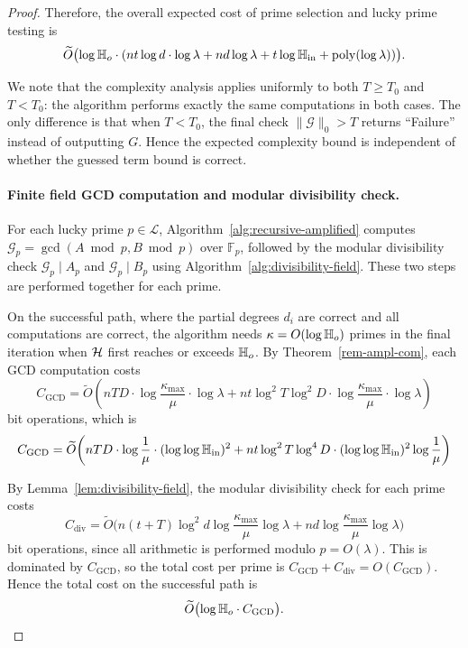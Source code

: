\documentclass{article}
\numberwithin{equation}{section}
\begin{document}
\begin{proof}
Therefore, the overall expected cost of prime selection and lucky prime testing is
\[
\widetilde{O}\bigl( \log \mathbb{H}_{o} \cdot (n t \log d \cdot \log \lambda + n d \log \lambda + t\log\mathbb{H}_{\rm in}+\operatorname{poly}(\log \lambda)) \bigr).
\]

We note that the complexity analysis applies uniformly to both $T \ge T_0$ and $T < T_0$: the algorithm performs exactly the same computations in both cases. The only difference is that when $T < T_0$, the final check $\|\mathcal{G}\|_0 > T$ returns ``Failure'' instead of outputting $G$. Hence the expected complexity bound is independent of whether the guessed term bound is correct.


\paragraph{Finite field GCD computation and modular divisibility check.}
For each lucky prime $p \in \mathcal{L}$, Algorithm~\ref{alg:recursive-amplified} computes $\mathcal{G}_p = \gcd(A \bmod p, B \bmod p)$ over $\mathbb{F}_p$, followed by the modular divisibility check $\mathcal{G}_p \mid A_p$ and $\mathcal{G}_p \mid B_p$ using Algorithm~\ref{alg:divisibility-field}. These two steps are performed together for each prime.

On the successful path, where the partial degrees $d_i$ are correct and all computations are correct, the algorithm needs $\kappa = O(\log \mathbb{H}_{o})$ primes in the final iteration when ${\mathcal{H}}$ first reaches or exceeds $\mathbb{H}_{o}$. By Theorem~\ref{rem-ampl-com}, each GCD computation costs
\[
C_{\text{GCD}} = \widetilde{O}\!\left( n T D \cdot \log \frac{\kappa_{\max}}{\mu}\cdot\log\lambda + n t \log^2 T \log^2 D \cdot \log \frac{\kappa_{\max}}{\mu}\cdot\log\lambda \right)
\]
bit operations, which is \[
C_{\text{GCD}} = \widetilde{O}\!\left( n T D \cdot \log \frac{1}{\mu}\cdot(\log\log \mathbb{H}_{\rm in})^2 + n t \log^2 T \log^4 D \cdot (\log\log \mathbb{H}_{\rm in})^2 \log\frac{1}{\mu} \right)
\]

By Lemma~\ref{lem:divisibility-field}, the modular divisibility check for each prime costs
\[
C_{\text{div}} = \widetilde{O}\bigl( n (t+T) \log^2 d \log\frac{\kappa_{\max}}{\mu}\log\lambda + n d \log\frac{\kappa_{\max}}{\mu}\log\lambda \bigr)
\]
bit operations, since all arithmetic is performed modulo $p = O(\lambda)$.
%
This is dominated by $C_{\text{GCD}}$, so the total cost per prime is $C_{\text{GCD}} + C_{\text{div}} = O(C_{\text{GCD}})$. Hence the total cost on the successful path is
\[
\widetilde{O}\bigl( \log \mathbb{H}_{o} \cdot C_{\text{GCD}} \bigr).
\]


\end{proof}
\end{document}

